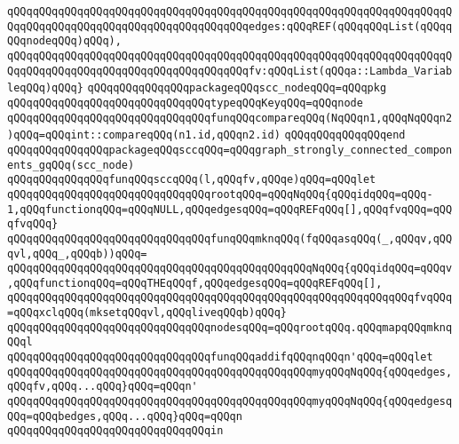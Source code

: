 \verb|qQQqqQQqqQQqqQQqqQQqqQQqqQQqqQQqqQQqqQQqqQQqqQQqqQQqqQQqqQQqqQQqqQQqqQQqqQQqqQQqqQQqqQQqqQQqqQQqqQQqqQQqqQQqedges:qQQqREF(qQQqqQQqList(qQQqqQQqnodeqQQq)qQQq),|\newline
\verb|qQQqqQQqqQQqqQQqqQQqqQQqqQQqqQQqqQQqqQQqqQQqqQQqqQQqqQQqqQQqqQQqqQQqqQQqqQQqqQQqqQQqqQQqqQQqqQQqqQQqqQQqqQQqfv:qQQqList(qQQqa::Lambda_VariableqQQq)qQQq}|\newline
\newline
\verb|qQQqqQQqqQQqqQQqpackageqQQqscc_nodeqQQq=qQQqpkg|\newline
\verb|qQQqqQQqqQQqqQQqqQQqqQQqqQQqqQQqtypeqQQqKeyqQQq=qQQqnode|\newline
\verb|qQQqqQQqqQQqqQQqqQQqqQQqqQQqqQQqfunqQQqcompareqQQq(NqQQqn1,qQQqNqQQqn2)qQQq=qQQqint::compareqQQq(n1.id,qQQqn2.id)|\newline
\verb|qQQqqQQqqQQqqQQqend|\newline
\newline
\verb|qQQqqQQqqQQqqQQqpackageqQQqsccqQQq=qQQqgraph_strongly_connected_components_gqQQq(scc_node)|\newline
\newline
\verb|qQQqqQQqqQQqqQQqfunqQQqsccqQQq(l,qQQqfv,qQQqe)qQQq=qQQqlet|\newline
\verb|qQQqqQQqqQQqqQQqqQQqqQQqqQQqqQQqrootqQQq=qQQqNqQQq{qQQqidqQQq=qQQq-1,qQQqfunctionqQQq=qQQqNULL,qQQqedgesqQQq=qQQqREFqQQq[],qQQqfvqQQq=qQQqfvqQQq}|\newline
\verb|qQQqqQQqqQQqqQQqqQQqqQQqqQQqqQQqfunqQQqmknqQQq(fqQQqasqQQq(_,qQQqv,qQQqvl,qQQq_,qQQqb))qQQq=|\newline
\verb|qQQqqQQqqQQqqQQqqQQqqQQqqQQqqQQqqQQqqQQqqQQqqQQqNqQQq{qQQqidqQQq=qQQqv,qQQqfunctionqQQq=qQQqTHEqQQqf,qQQqedgesqQQq=qQQqREFqQQq[],|\newline
\verb|qQQqqQQqqQQqqQQqqQQqqQQqqQQqqQQqqQQqqQQqqQQqqQQqqQQqqQQqqQQqqQQqfvqQQq=qQQqxclqQQq(mksetqQQqvl,qQQqliveqQQqb)qQQq}|\newline
\verb|qQQqqQQqqQQqqQQqqQQqqQQqqQQqqQQqnodesqQQq=qQQqrootqQQq.qQQqmapqQQqmknqQQql|\newline
\verb|qQQqqQQqqQQqqQQqqQQqqQQqqQQqqQQqfunqQQqaddifqQQqnqQQqn'qQQq=qQQqlet|\newline
\verb|qQQqqQQqqQQqqQQqqQQqqQQqqQQqqQQqqQQqqQQqqQQqqQQqmyqQQqNqQQq{qQQqedges,qQQqfv,qQQq...qQQq}qQQq=qQQqn'|\newline
\verb|qQQqqQQqqQQqqQQqqQQqqQQqqQQqqQQqqQQqqQQqqQQqqQQqmyqQQqNqQQq{qQQqedgesqQQq=qQQqbedges,qQQq...qQQq}qQQq=qQQqn|\newline
\verb|qQQqqQQqqQQqqQQqqQQqqQQqqQQqqQQqin|\newline
